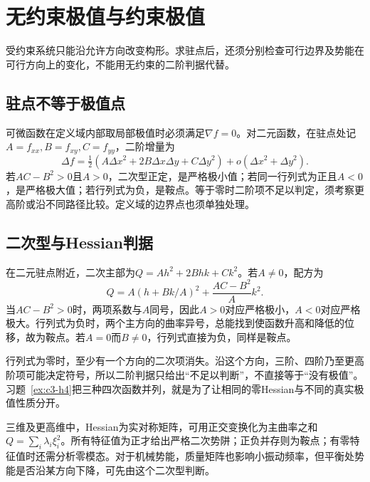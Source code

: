 \section{无约束极值与约束极值}\label{sec:c3-extrema}
受约束系统只能沿允许方向改变构形。求驻点后，还须分别检查可行边界及势能在可行方向上的变化，不能用无约束的二阶判据代替。

\subsection{驻点不等于极值点}
可微函数在定义域内部取局部极值时必须满足$\nabla f=0$。对二元函数，在驻点处记$A=f_{xx},B=f_{xy},C=f_{yy}$，二阶增量为
\[\Delta f=\tfrac12(A\Delta x^2+2B\Delta x\Delta y+C\Delta y^2)+o(\Delta x^2+\Delta y^2).\]
若$AC-B^2>0$且$A>0$，二次型正定，是严格极小值；若同一行列式为正且$A<0$，是严格极大值；若行列式为负，是鞍点。等于零时二阶项不足以判定，须考察更高阶或沿不同路径比较。定义域的边界点也须单独处理。

\subsection{二次型与Hessian判据}
在二元驻点附近，二次主部为$Q=Ah^2+2Bhk+Ck^2$。若$A\ne0$，配方为
\[Q=A(h+Bk/A)^2+\frac{AC-B^2}{A}k^2.\]
当$AC-B^2>0$时，两项系数与$A$同号，因此$A>0$对应严格极小，$A<0$对应严格极大。行列式为负时，两个主方向的曲率异号，总能找到使函数升高和降低的位移，故为鞍点。若$A=0$而$B\ne0$，行列式直接为负，同样是鞍点。

行列式为零时，至少有一个方向的二次项消失。沿这个方向，三阶、四阶乃至更高阶项可能决定符号，所以二阶判据只给出“不足以判断”，不直接等于“没有极值”。习题~\ref{ex:c3-h4}把三种四次函数并列，就是为了让相同的零Hessian与不同的真实极值性质分开。

三维及更高维中，Hessian为实对称矩阵，可用正交变换化为主曲率之和$Q=\sum_i\lambda_i\xi_i^2$。所有特征值为正才给出严格二次势阱；正负并存则为鞍点；有零特征值时还需分析零模态。对于机械势能，质量矩阵也影响小振动频率，但平衡处势能是否沿某方向下降，可先由这个二次型判断。

